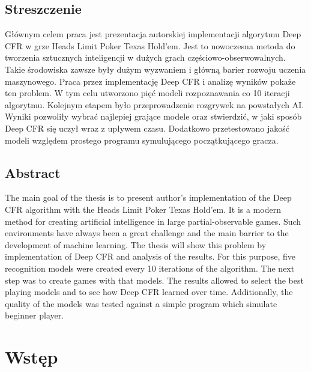 \documentclass[12pt,oneside,a4paper]{report}
\begin{document}


\section*{Streszczenie}

Głównym celem praca jest prezentacja autorskiej implementacji algorytmu Deep CFR w grze Heads Limit Poker Texas Hold'em. Jest to nowoczesna metoda do tworzenia sztucznych inteligencji w dużych grach częściowo-obserwowalnych. Takie środowiska zawsze były dużym wyzwaniem i główną barier rozwoju uczenia maszynowego. Praca przez implementację Deep CFR i analizę wyników pokaże ten problem.
W tym celu utworzono pięć modeli rozpoznawania co 10 iteracji algorytmu. Kolejnym etapem było przeprowadzenie rozgrywek na powstałych AI. Wyniki pozwoliły wybrać najlepiej grające modele oraz stwierdzić, w jaki sposób Deep CFR się uczył wraz z upływem czasu. Dodatkowo przetestowano jakość modeli względem prostego programu symulującego początkującego gracza.


\vspace{2cm}
\section*{Abstract}

The main goal of the thesis is to present author's implementation of the Deep CFR algorithm with the Heads Limit Poker Texas Hold'em. It is a modern method for creating artificial intelligence in large partial-observable games. Such environments have always been a great challenge and the main barrier to the development of machine learning. The thesis will show this problem by implementation of Deep CFR and analysis of the results.
For this purpose, five recognition models were created every 10 iterations of the algorithm. 
The next step was to create games with that models. The results allowed to select the best playing models and to see how Deep CFR learned over time. Additionally, the quality of the models was tested against a simple program which simulate beginner player.




\tableofcontents{}
\newpage

\setlength{\parindent}{0.5em}
\setlength{\parskip}{0.5em}
\renewcommand{\baselinestretch}{1.5}



\chapter{Wstęp}
\end{document}
